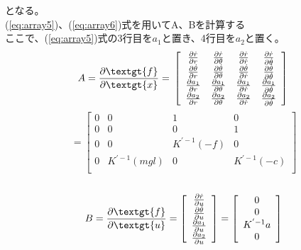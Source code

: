 	となる。\\
	(\ref{eq:array5})、(\ref{eq:array6})式を用いてA、Bを計算する\\
	ここで、(\ref{eq:array5})式の3行目を$a_{1}$と置き、4行目を$a_{2}$と置く。\\
	\begin{equation}
		A=\frac{\partial \textgt{f}}{\partial \textgt{x}}=\\
		\left[
		\begin{array}{cccc}
			\frac{\partial \dot{r}}{\partial r} & \frac{\partial \dot{r}}{\partial \theta} & \frac{\partial \dot{r}}{\partial \dot{r}} & \frac{\partial \dot{r}}{\partial \dot{\theta}} \\
			\frac{\partial \dot{\theta}}{\partial r} & \frac{\partial \dot{\theta}}{\partial \theta} & \frac{\partial \dot{\theta}}{\partial \dot{r}} & \frac{\partial \dot{\theta}}{\partial \dot{\theta}} \\
			\frac{\partial a_{1}}{\partial r} & \frac{\partial a_{1}}{\partial \theta} & \frac{\partial a_{1}}{\partial \dot{r}} & \frac{\partial a_{1}}{\partial \dot{\theta}} \\
			\frac{\partial a_{2}}{\partial r} & \frac{\partial a_{2}}{\partial \theta} & \frac{\partial a_{2}}{\partial \dot{r}} & \frac{\partial a_{2}}{\partial \dot{\theta}} \\
		\end{array}
		\right]\\
	\end{equation}
	\begin{equation}
		=\left[
		\begin{array}{cccc}
			0 & 0 & 1 & 0 \\
			0 & 0 & 0 & 1 \\
			0 & 0 & K^{'-1}(-f) & 0\\
			0 & K^{'-1}(mgl) & 0 & K^{'-1}(-c) \\
		\end{array}
		\right]
	\end{equation}
	\\
	\begin{equation}
		B=\frac{\partial \textgt{f}}{\partial \textgt{u}}=
		\left[
		\begin{array}{c}
			\frac{\partial \dot{r}}{\partial u}\\
			\frac{\partial \dot{\theta}}{\partial u}\\
			\frac{\partial a_{1}}{\partial u}\\
			\frac{\partial a_{2}}{\partial u}\\
		\end{array}
		\right]=
		\left[
		\begin{array}{c}
			0\\
			0\\
			K^{'-1}a\\
			0\\
		\end{array}
		\right]
		\label{eq:array7}
	\end{equation}
